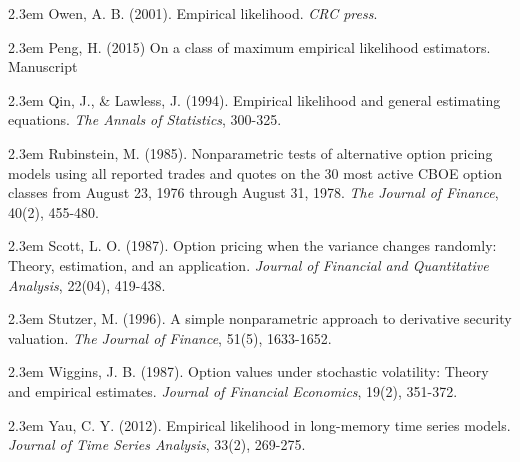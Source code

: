 \documentclass[oneside,english]{amsbook}
\numberwithin{section}{chapter}
\numberwithin{equation}{section}
\numberwithin{figure}{section}
\theoremstyle{plain}
\theoremstyle{plain}
\theoremstyle{definition}
\theoremstyle{plain}
\theoremstyle{plain}
\theoremstyle{remark}
\theoremstyle{definition}
\theoremstyle{definition}
\begin{document}
\par\noindent\hangindent2.3em
Owen, A. B. (2001). Empirical likelihood. {\em CRC press}.

\par\noindent\hangindent2.3em
Peng, H. (2015) On a class of maximum empirical likelihood estimators. Manuscript



\par\noindent\hangindent2.3em
Qin, J., \& Lawless, J. (1994). Empirical likelihood and general estimating equations. {\em The Annals of Statistics}, 300-325.

\par\noindent\hangindent2.3em
Rubinstein, M. (1985). Nonparametric tests of alternative option pricing models using all reported trades and quotes on the 30 most active CBOE option classes from August 23, 1976 through August 31, 1978. {\em The Journal of Finance}, 40(2), 455-480.

\par\noindent\hangindent2.3em
Scott, L. O. (1987). Option pricing when the variance changes randomly: Theory, estimation, and an application. {\em Journal of Financial and Quantitative Analysis}, 22(04), 419-438.

\par\noindent\hangindent2.3em
Stutzer, M. (1996). A simple nonparametric approach to derivative security valuation. {\em The Journal of Finance}, 51(5), 1633-1652.

\par\noindent\hangindent2.3em
Wiggins, J. B. (1987). Option values under stochastic volatility: Theory and empirical estimates. {\em Journal of Financial Economics}, 19(2), 351-372.

\par\noindent\hangindent2.3em
Yau, C. Y. (2012). Empirical likelihood in long-memory time series models. {\em Journal of Time Series Analysis}, 33(2), 269-275.
\end{document}
